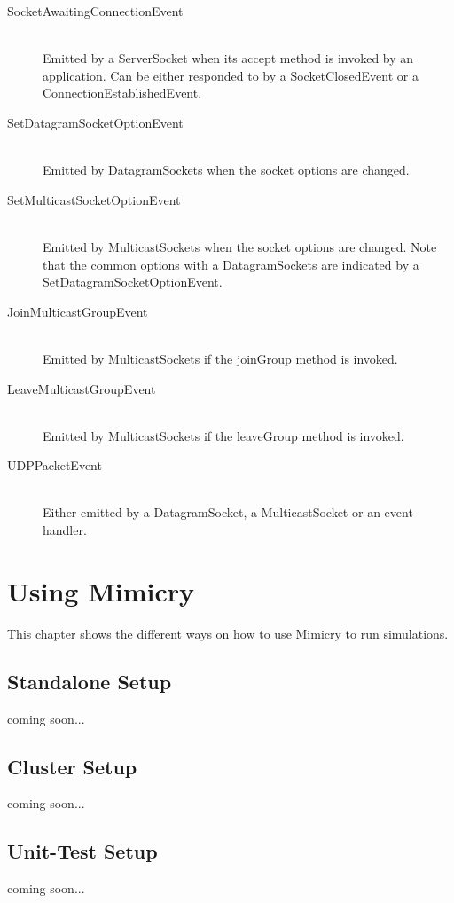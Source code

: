 \documentclass[a4paper,oneside]{book}
\begin{document}
\begin{description}
\item[SocketAwaitingConnectionEvent] \hfill \\
Emitted by a ServerSocket when its accept method is invoked by an application. Can be either responded to by a SocketClosedEvent or a ConnectionEstablishedEvent.

\item[SetDatagramSocketOptionEvent] \hfill \\
Emitted by DatagramSockets when the socket options are changed.

\item[SetMulticastSocketOptionEvent] \hfill \\
Emitted by MulticastSockets when the socket options are changed. Note that the common options with a DatagramSockets are indicated by a SetDatagramSocketOptionEvent.

\item[JoinMulticastGroupEvent] \hfill \\
Emitted by MulticastSockets if the joinGroup method is invoked.

\item[LeaveMulticastGroupEvent] \hfill \\
Emitted by MulticastSockets if the leaveGroup method is invoked.

\item[UDPPacketEvent] \hfill \\
Either emitted by a DatagramSocket, a MulticastSocket or an event handler.
\end{description}


\chapter{Using Mimicry}
This chapter shows the different ways on how to use Mimicry to run simulations.

\section{Standalone Setup}
coming soon...

\section{Cluster Setup}
coming soon...

\section{Unit-Test Setup}
coming soon...
\end{document}

